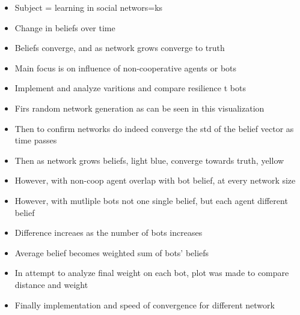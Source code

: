 \documentclass{article}
\begin{document}
\begin{itemize}
    \item Subject = learning in social networs=ks
    \item Change in beliefs over time
    \item Beliefs converge, and as network grows converge to truth
    \item Main focus is on influence of non-cooperative agents or bots
    \item Implement and analyze varitions and compare resilience t bots
    \item Firs random network generation as can be seen in this visualization
    \item Then to confirm networks do indeed converge the std of the belief vector as time passes
    \item Then as network grows beliefs, light blue, converge towards truth, yellow
    \item However, with non-coop agent overlap with bot belief, at every network size
    \item However, with mutliple bots not one single belief, but each agent different belief
    \item Difference increaes as the number of bots increases
    \item Average belief becomes weighted sum of bots' beliefs
    \item In attempt to analyze final weight on each bot, plot was made to compare distance and weight
    \item Finally implementation and speed of convergence for different network
\end{itemize}
\end{document}
